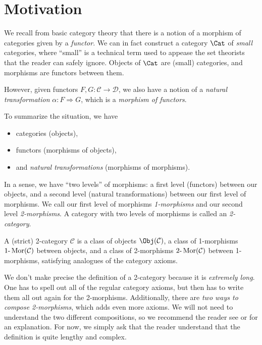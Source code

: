 \section{Motivation}\label{sec1}

We recall from basic category theory that there is a notion of a morphism of categories given by a \emph{functor}. We can in fact construct a category $\Cat $ of \emph{small} categories, where ``small'' is a technical term used to appease the set theorists that the reader can safely ignore. Objects of $\Cat $ are (small) categories, and morphisms are functors between them.

However, given functors $F,G : \mathcal{C}  \to \mathcal{D} $, we also have a notion of a \emph{natural transformation} $\alpha : F \Rightarrow G$, which is a \emph{morphism of functors}.

To summarize the situation, we have
\begin{itemize}
	\item categories (objects),
	\item functors (morphisms of objects),
	\item and \emph{natural transformations} (morphisms of morphisms).
\end{itemize}
In a sense, we have ``two levels'' of morphisms: a first level (functors) between our objects, and a second level (natural transformations) between our first level of morphisms. We call our first level of morphisms \emph{1-morphisms} and our second level \emph{2-morphisms}. A category with two levels of morphisms is called an \emph{2-category}.

\begin{definition}\label{2.5}
	A (strict) 2-category $\mathcal{C} $ is a class of objects $\Obj(\mathcal{C} ) $, a class of 1-morphisms $1\text{-} \operatorname{Mor}(\mathcal{C} )$ between objects, and a class of 2-morphisms $2\text{-} \operatorname{Mor}(\mathcal{C} )$ between 1-morphisms, satisfying analogues of the category axioms.
\end{definition}

We don't make precise the definition of a 2-category because it is \emph{extremely long}. One has to spell out all of the regular category axioms, but then has to write them all out again for the 2-morphisms. Additionally, there are \emph{two ways to compose 2-morphisms}, which adds even more axioms. We will not need to understand the two different compositions, so we recommend the reader see \cite{ml} or \cite{context} for an explanation. For now, we simply ask that the reader understand that the definition is quite lengthy and complex.

